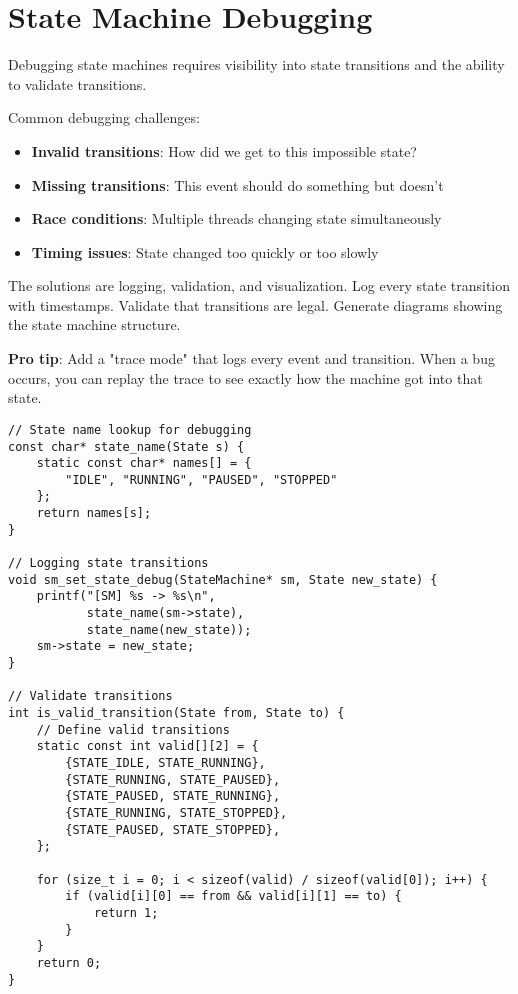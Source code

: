 \section{State Machine Debugging}

Debugging state machines requires visibility into state transitions and the ability to validate transitions.

Common debugging challenges:
\begin{itemize}
    \item \textbf{Invalid transitions}: How did we get to this impossible state?
    \item \textbf{Missing transitions}: This event should do something but doesn't
    \item \textbf{Race conditions}: Multiple threads changing state simultaneously
    \item \textbf{Timing issues}: State changed too quickly or too slowly
\end{itemize}

The solutions are logging, validation, and visualization. Log every state transition with timestamps. Validate that transitions are legal. Generate diagrams showing the state machine structure.

\textbf{Pro tip}: Add a "trace mode" that logs every event and transition. When a bug occurs, you can replay the trace to see exactly how the machine got into that state.

\begin{lstlisting}
// State name lookup for debugging
const char* state_name(State s) {
    static const char* names[] = {
        "IDLE", "RUNNING", "PAUSED", "STOPPED"
    };
    return names[s];
}

// Logging state transitions
void sm_set_state_debug(StateMachine* sm, State new_state) {
    printf("[SM] %s -> %s\n",
           state_name(sm->state),
           state_name(new_state));
    sm->state = new_state;
}

// Validate transitions
int is_valid_transition(State from, State to) {
    // Define valid transitions
    static const int valid[][2] = {
        {STATE_IDLE, STATE_RUNNING},
        {STATE_RUNNING, STATE_PAUSED},
        {STATE_PAUSED, STATE_RUNNING},
        {STATE_RUNNING, STATE_STOPPED},
        {STATE_PAUSED, STATE_STOPPED},
    };

    for (size_t i = 0; i < sizeof(valid) / sizeof(valid[0]); i++) {
        if (valid[i][0] == from && valid[i][1] == to) {
            return 1;
        }
    }
    return 0;
}
\end{lstlisting}

